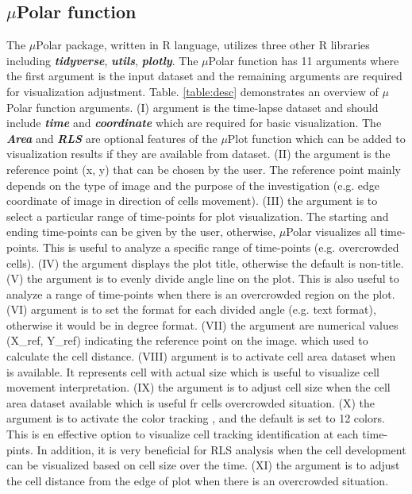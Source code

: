 \documentclass[conference]{IEEEtran}
\begin{document}
\subsection{$\mu$Polar function}
The $\mu$Polar package, written in R language, utilizes three other R libraries including \textbf{\textit{tidyverse}}, \textbf{\textit{utils}}, \textbf{\textit{plotly}}. The $\mu$Polar function has 11 arguments where the first argument is the input dataset and the remaining arguments are required for visualization adjustment. Table. \ref{table:desc} demonstrates an overview of $\mu$Polar function arguments. (I) argument is the time-lapse dataset and should include \textbf{\textit{time}} and \textbf{\textit{coordinate}} which are required for basic visualization. The \textbf{\textit{Area}} and \textbf{\textit{RLS}} are optional features of the $\mu$Plot function which can be added to visualization results if they are available from dataset. (II) the argument is the reference point (x, y) that can be chosen by the user. The reference point mainly depends on the type of image and the purpose of the investigation (e.g. edge coordinate of image in direction of cells movement). (III) the argument is to select a particular range of time-points for plot visualization. The starting and ending time-points can be given by the user, otherwise, $\mu$Polar visualizes all time-points. This is useful to analyze a specific range of time-points (e.g. overcrowded cells). (IV) the argument displays the plot title, otherwise the default is non-title. (V) the argument is to evenly divide angle line on the plot. This is also useful to analyze a range of time-points when there is an overcrowded region on the plot. (VI) argument is to set the format for each divided angle (e.g. text format), otherwise it would be in degree format. (VII) the argument are numerical values (X\_{ref}, Y\_{ref}) indicating the reference point on the image. which used to calculate the cell distance. (VIII) argument is to activate cell area dataset  when is available. It represents cell with actual size which is useful to visualize cell movement interpretation. (IX) the argument is to adjust cell size when the cell area dataset available which is useful fr cells overcrowded situation. (X) the argument is to activate the color tracking , and the default is set to 12 colors. This is en effective option to visualize cell tracking identification at each time-pints. In addition, it is very beneficial for RLS analysis when the cell development can be visualized based on cell size over the time. (XI) the argument is to adjust the cell distance from the edge of plot when there is an overcrowded situation. 
\end{document}
